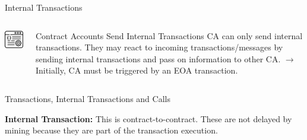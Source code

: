 \documentclass[handout]{beamer}
\begin{document}
\begin{frame}{Internal Transactions}

\begin{columns}[T]
	\begin{column}{0.35\textwidth}
		\includegraphics[width=3cm]{../assets/images/CA}
	\end{column} %
		
	\begin{column}{0.65\textwidth}
		\begin{alertblock}{Contract Accounts Send Internal Transactions}
			CA can only send internal transactions. They may react to incoming transactions/messages by sending internal transactions and pass on information to other CA. $\rightarrow$ Initially, CA must be triggered by an EOA transaction.
		\end{alertblock}
	\end{column}
	
\end{columns}
\vspace{1em}



\end{frame}

\begin{frame}{Transactions, Internal Transactions and Calls}

\textbf{Internal Transaction:} This is contract-to-contract. These are not delayed by mining because they are part of the transaction execution.
\vspace{1em}

\vspace{1em}


\vspace{1em}


\end{frame}
\end{document}
